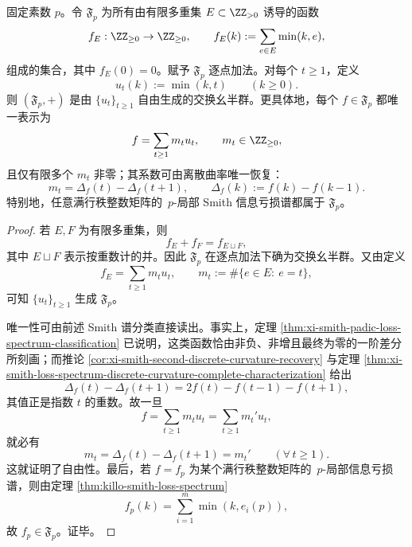 \begin{theorem}\label{thm:xi-smith-local-loss-profiles-free-commutative-monoid}
固定素数 \(p\)。令 \(\mathfrak F_p\) 为所有由有限多重集 \(E\subset \ZZ_{>0}\) 诱导的函数
\[
f_E:\ZZ_{\ge 0}\to \ZZ_{\ge 0},
\qquad
f_E(k):=\sum_{e\in E}\min(k,e),
\]
组成的集合，其中 \(f_E(0)=0\)。赋予 \(\mathfrak F_p\) 逐点加法。对每个 \(t\ge 1\)，定义
\[
u_t(k):=\min(k,t)\qquad(k\ge 0).
\]
则 \((\mathfrak F_p,+)\) 是由 \(\{u_t\}_{t\ge 1}\) 自由生成的交换幺半群。更具体地，每个 \(f\in\mathfrak F_p\) 都唯一表示为
\[
f=\sum_{t\ge 1}m_tu_t,
\qquad
m_t\in \ZZ_{\ge 0},
\]
且仅有限多个 \(m_t\) 非零；其系数可由离散曲率唯一恢复：
\[
m_t=\Delta_f(t)-\Delta_f(t+1),
\qquad
\Delta_f(k):=f(k)-f(k-1).
\]
特别地，任意满行秩整数矩阵的 \(\,p\)-局部 Smith 信息亏损谱都属于 \(\mathfrak F_p\)。
\end{theorem}
\begin{proof}
若 \(E,F\) 为有限多重集，则
\[
f_E+f_F=f_{E\sqcup F},
\]
其中 \(E\sqcup F\) 表示按重数计的并。因此 \(\mathfrak F_p\) 在逐点加法下确为交换幺半群。又由定义
\[
f_E=\sum_{t\ge 1}m_tu_t,
\qquad
m_t:=\#\{e\in E:\ e=t\},
\]
可知 \(\{u_t\}_{t\ge 1}\) 生成 \(\mathfrak F_p\)。

唯一性可由前述 Smith 谱分类直接读出。事实上，定理 \ref{thm:xi-smith-padic-loss-spectrum-classification} 已说明，这类函数恰由非负、非增且最终为零的一阶差分所刻画；而推论 \ref{cor:xi-smith-second-discrete-curvature-recovery} 与定理 \ref{thm:xi-smith-loss-spectrum-discrete-curvature-complete-characterization} 给出
\[
\Delta_f(t)-\Delta_f(t+1)
=
2f(t)-f(t-1)-f(t+1),
\]
其值正是指数 \(t\) 的重数。故一旦
\[
f=\sum_{t\ge 1}m_tu_t=\sum_{t\ge 1}m_t'u_t,
\]
就必有
\[
m_t=\Delta_f(t)-\Delta_f(t+1)=m_t'
\qquad(\forall\,t\ge 1).
\]
这就证明了自由性。最后，若 \(f=f_p\) 为某个满行秩整数矩阵的 \(\,p\)-局部信息亏损谱，则由定理 \ref{thm:killo-smith-loss-spectrum}
\[
f_p(k)=\sum_{i=1}^{m}\min(k,e_i(p)),
\]
故 \(f_p\in \mathfrak F_p\)。证毕。
\end{proof}

